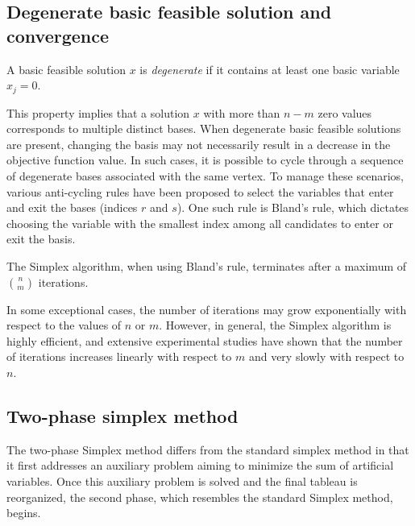 \subsection*{Degenerate basic feasible solution and convergence}
\begin{definition}
    A basic feasible solution $x$ is \emph{degenerate} if it contains at least one basic variable $x_j=0$.
\end{definition}
This property implies that a solution $x$ with more than $n - m$ zero values corresponds to multiple distinct bases. 
When degenerate basic feasible solutions are present, changing the basis may not necessarily result in a decrease in the objective function value.
In such cases, it is possible to cycle through a sequence of degenerate bases associated with the same vertex.
To manage these scenarios, various anti-cycling rules have been proposed to select the variables that enter and exit the bases (indices $r$ and $s$). 
One such rule is Bland's rule, which dictates choosing the variable with the smallest index among all candidates to enter or exit the basis.
\newpage
\begin{proposition}
    The Simplex algorithm, when using Bland's rule, terminates after a maximum of $\binom{n}{m}$ iterations.
\end{proposition}
In some exceptional cases, the number of iterations may grow exponentially with respect to the values of $n$ or $m$. 
However, in general, the Simplex algorithm is highly efficient, and extensive experimental studies have shown that the number of iterations increases linearly with respect to $m$ and very slowly with respect to $n$. 

\subsection*{Two-phase simplex method}
The two-phase Simplex method differs from the standard simplex method in that it first addresses an auxiliary problem aiming to minimize the sum of artificial variables. 
Once this auxiliary problem is solved and the final tableau is reorganized, the second phase, which resembles the standard Simplex method, begins.


